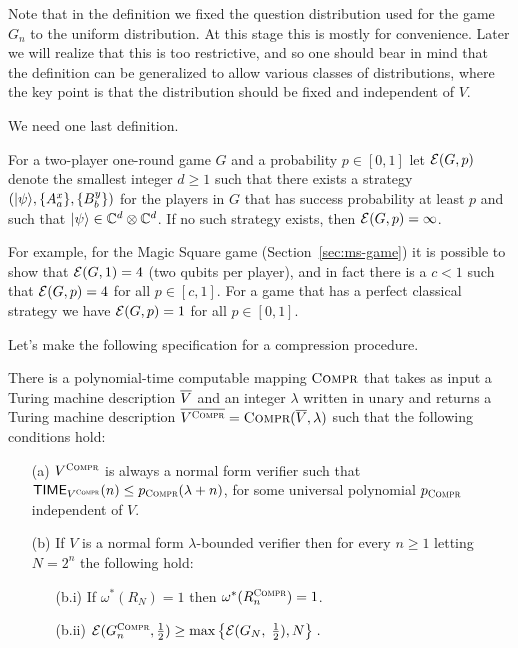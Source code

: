 Note that in the definition we fixed the question distribution used for the game $G_n$ to the uniform distribution. At this stage this is mostly for convenience. Later we will realize that this is too restrictive, and so one should bear in mind that the definition can be generalized to allow various classes of distributions, where the key point is that the distribution should be fixed and independent of $V$. 

We need one last definition.

\begin{definition}
For a two-player one-round game $G$ and a probability $p\in[0,1]$ let $\mathcal{E}(G,p)$ denote the smallest integer $d\geq 1$ such that there exists a strategy $(|\psi\rangle,\{A^x_a\},\{B^y_b\})$ for the players in $G$ that has success probability at least $p$ and such that $|\psi\rangle \in \mathbb{C}^d \otimes \mathbb{C}^d$. If no such strategy exists, then $\mathcal{E}(G,p) = \infty$. 
\end{definition}

For example, for the Magic Square game (Section~\ref{sec:ms-game}) it is possible to show that $\mathcal{E}(G,1)=4$ (two qubits per player), and in fact there is a $c<1$ such that $\mathcal{E}(G,p)=4$ for all $p\in[c,1]$. For a game that has a perfect classical strategy we have $\mathcal{E}(G,p)=1$ for all $p\in[0,1]$. 

Let's make the following specification for a compression procedure. 

\begin{claim}\label{claim:compression}
There is a polynomial-time computable mapping $\textsc{Compr}$ that takes as input a Turing machine description $\overline{V}$ and an integer $\lambda$ written in unary and returns a Turing machine description $\overline{V^{\textsc{Compr}}} = \textsc{Compr}(\overline{V},\lambda)$ such that the following conditions hold: 
\begin{itemize}
\item[(a)] $V^{\textsc{Compr}}$ is always a normal form verifier such that $\mathsf{TIME}_{V^{\textsc{Compr}}}(n) \leq p_{\textsc{Compr}}(\lambda + n)$, for some universal polynomial $p_{\textsc{Compr}}$ independent of $V$.
\item[(b)] If $V$ is a normal form $\lambda$-bounded verifier then for every $n\geq 1$ letting $N=2^n$ the following hold:
\begin{itemize}
\item[(b.i)] If $\omega^*(R_N)=1$ then $\omega^*(R^{\textsc{Compr}}_n)=1$. 
\item[(b.ii)] $\mathcal{E}(G^{\textsc{Compr}}_n,\frac{1}{2}) \geq \max\big\{\mathcal{E}(G_N,\;\frac{1}{2}),N\big\}\;.$
\end{itemize}
\end{itemize}
\end{claim}

